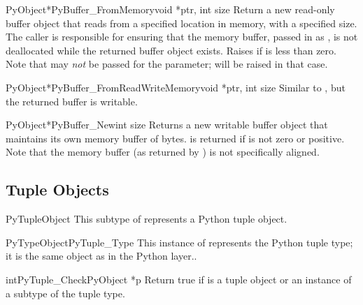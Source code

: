 \begin{cfuncdesc}{PyObject*}{PyBuffer_FromMemory}{void *ptr, int size}
  Return a new read-only buffer object that reads from a specified
  location in memory, with a specified size.  The caller is
  responsible for ensuring that the memory buffer, passed in as
  , is not deallocated while the returned buffer object
  exists.  Raises  if  is less than
  zero.  Note that  may \emph{not} be
  passed for the  parameter;  will be
  raised in that case.
\end{cfuncdesc}

\begin{cfuncdesc}{PyObject*}{PyBuffer_FromReadWriteMemory}{void *ptr, int size}
  Similar to , but the returned
  buffer is writable.
\end{cfuncdesc}

\begin{cfuncdesc}{PyObject*}{PyBuffer_New}{int size}
  Returns a new writable buffer object that maintains its own memory
  buffer of  bytes.   is returned if
   is not zero or positive.  Note that the memory buffer (as
  returned by ) is not specifically
  aligned.
\end{cfuncdesc}


\subsection{Tuple Objects \label{tupleObjects}}

\begin{ctypedesc}{PyTupleObject}
  This subtype of  represents a Python tuple object.
\end{ctypedesc}

\begin{cvardesc}{PyTypeObject}{PyTuple_Type}
  This instance of  represents the Python tuple
  type; it is the same object as  in the Python
  layer..
\end{cvardesc}

\begin{cfuncdesc}{int}{PyTuple_Check}{PyObject *p}
  Return true if  is a tuple object or an instance of a subtype
  of the tuple type.
\end{cfuncdesc}

